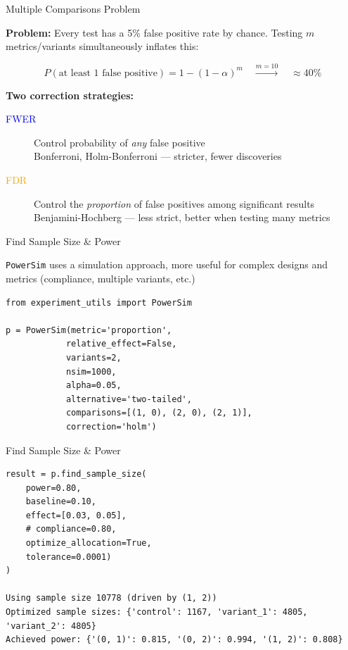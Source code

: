 \documentclass{beamer}
\newcommand{\blue}[1]{\textcolor{blue}{#1}}
\newcommand{\orange}[1]{\textcolor{orange}{#1}}
\begin{document}
\begin{frame}{Multiple Comparisons Problem }

\textbf{Problem:} Every test has a 5\% false positive rate by chance. Testing $m$ metrics/variants simultaneously inflates this:

$$P(\text{at least 1 false positive}) = 1 - (1-\alpha)^m \quad \xrightarrow{m=10} \quad \approx 40\%$$

\textbf{Two correction strategies:}
\begin{description}
    \item[\blue{FWER}] Control probability of \emph{any} false positive\\
        Bonferroni, Holm-Bonferroni --- stricter, fewer discoveries
    \item[\orange{FDR}] Control the \emph{proportion} of false positives among significant results\\
        Benjamini-Hochberg --- less strict, better when testing many metrics
\end{description}

\end{frame}



\begin{frame}[fragile]{Find Sample Size \& Power }

\texttt{PowerSim} uses a simulation approach, more useful for complex designs and metrics (compliance, multiple variants, etc.)

\vspace{1cm}
\begin{verbatim}
from experiment_utils import PowerSim

p = PowerSim(metric='proportion',
            relative_effect=False,
            variants=2, 
            nsim=1000,
            alpha=0.05,
            alternative='two-tailed',
            comparisons=[(1, 0), (2, 0), (2, 1)],
            correction='holm')
\end{verbatim}

\end{frame}

\begin{frame}[fragile]{Find Sample Size \& Power }

\begin{verbatim}
result = p.find_sample_size(
    power=0.80,
    baseline=0.10,
    effect=[0.03, 0.05],
    # compliance=0.80,
    optimize_allocation=True,
    tolerance=0.0001)
)

Using sample size 10778 (driven by (1, 2))
Optimized sample sizes: {'control': 1167, 'variant_1': 4805, 'variant_2': 4805}
Achieved power: {'(0, 1)': 0.815, '(0, 2)': 0.994, '(1, 2)': 0.808}

\end{verbatim}

\end{frame}
\end{document}
